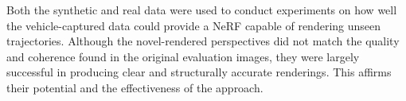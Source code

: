 Both the synthetic and real data were used to conduct experiments on how well the vehicle-captured data could provide a NeRF capable of rendering unseen trajectories. Although the novel-rendered perspectives did not match the quality and coherence found in the original evaluation images, they were largely successful in producing clear and structurally accurate renderings. This affirms their potential and the effectiveness of the approach.


\begin{comment}
Initially, this pipeline was applied to synthetic data gathered from a controlled virtual environment, CARLA, which facilitated the creation of a performance baseline. The establishment of this baseline underscored the significance of various parameters for the quality of the data capture and subsequent NeRF. The parameters included camera setup, segment length, dataset size, image resolution, and vehicle speed.

Subsequent experimentation built upon this baseline, revealing important findings. Optimized camera poses consistently produced superior renderings despite the presence of noise, with shorter segments proving particularly effective. In contrast, non-optimized poses only excelled with perfect camera poses. Furthermore, our experiments demonstrated that COLMAP pre-processing overwhelmingly outperformed joint camera pose optimization, even in high-noise situations, arguing for its consideration despite an upfront time investment.

Progressing into the exploration of large-scale NeRF approaches, we implemented a naive variant. The promising results of this implementation were evident across multiple scenes, with image synthesis displaying sharper details and a notable improvement in overall visual quality.

Applying the acquired knowledge from the previous experiments, a dataparser for the NAPLab vehicle was created, allowing the end-to-end pipeline to be used on real data. Despite lower-quality image synthesis due to the uncontrollable environment, many of the findings from the controllable, virtual environment held true. Although optimizing camera poses performed better than not optimizing them, COLMAP outperformed joint camera optimization overall. Additionally, the naive Block-NeRF implementation performed better than a single NeRF.
\end{comment}

